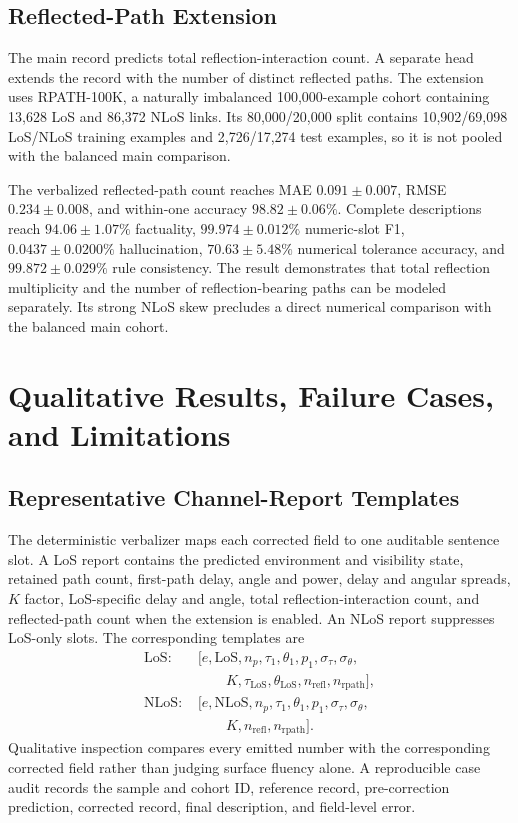 \subsection{Reflected-Path Extension}

The main record predicts total reflection-interaction count. A separate head extends the record with
the number of distinct reflected paths. The extension uses RPATH-100K, a naturally imbalanced
100,000-example cohort containing 13,628 LoS and 86,372 NLoS links. Its 80,000/20,000 split contains
10,902/69,098 LoS/NLoS training examples and 2,726/17,274 test examples, so it is not pooled with
the balanced main comparison.

The verbalized reflected-path count reaches MAE $0.091\pm0.007$, RMSE $0.234\pm0.008$, and
within-one accuracy $98.82\pm0.06\%$. Complete descriptions reach
$94.06\pm1.07\%$ factuality, $99.974\pm0.012\%$ numeric-slot F1,
$0.0437\pm0.0200\%$ hallucination, $70.63\pm5.48\%$ numerical tolerance accuracy, and
$99.872\pm0.029\%$ rule consistency. The result demonstrates that total reflection multiplicity and
the number of reflection-bearing paths can be modeled separately. Its strong NLoS skew precludes a
direct numerical comparison with the balanced main cohort.

\section{Qualitative Results, Failure Cases, and Limitations}

\subsection{Representative Channel-Report Templates}

The deterministic verbalizer maps each corrected field to one auditable sentence slot. A LoS report
contains the predicted environment and visibility state, retained path count, first-path delay, angle and
power, delay and angular spreads, $K$ factor, LoS-specific delay and angle, total reflection-interaction
count, and reflected-path count when the extension is enabled. An NLoS report suppresses LoS-only
slots. The corresponding templates are
\begin{align*}
\text{LoS: }&[e,\mathrm{LoS},n_p,\tau_1,\theta_1,p_1,\sigma_\tau,\sigma_\theta,\\[-2pt]
&\qquad K,\tau_{\mathrm{LoS}},\theta_{\mathrm{LoS}},n_{\mathrm{refl}},n_{\mathrm{rpath}}],\\
\text{NLoS: }&[e,\mathrm{NLoS},n_p,\tau_1,\theta_1,p_1,\sigma_\tau,\sigma_\theta,\\[-2pt]
&\qquad K,n_{\mathrm{refl}},n_{\mathrm{rpath}}].
\end{align*}
Qualitative inspection compares every emitted number with the corresponding corrected field rather
than judging surface fluency alone. A reproducible case audit records the sample and cohort ID,
reference record, pre-correction prediction, corrected record, final description, and field-level error.

